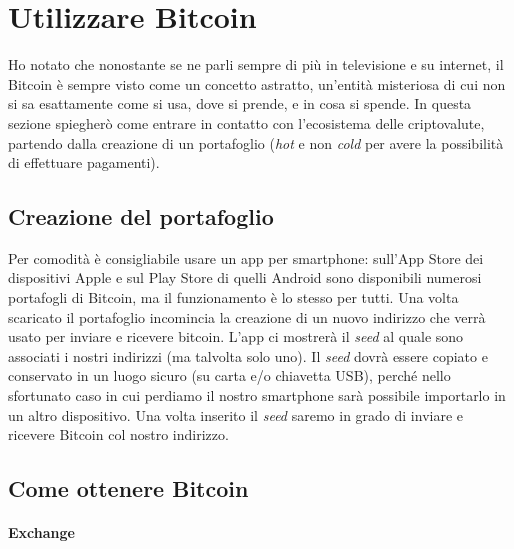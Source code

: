 \documentclass {article}
\begin{document}
\newpage


\section {Utilizzare Bitcoin}


Ho notato che nonostante se ne parli sempre di più in televisione e su internet, il Bitcoin è sempre visto come un concetto astratto, un'entità misteriosa di cui non si sa esattamente come si usa, dove si prende, e in cosa si spende.
In questa sezione spiegherò come entrare in contatto con l'ecosistema delle criptovalute, partendo dalla creazione di un portafoglio (\textit{hot} e non \textit{cold} per avere la possibilità di effettuare pagamenti).


\subsection {Creazione del portafoglio}


Per comodità è consigliabile usare un app per smartphone: sull'App Store dei dispositivi Apple e sul Play Store di quelli Android sono disponibili numerosi portafogli di Bitcoin, ma il funzionamento è lo stesso per tutti.
Una volta scaricato il portafoglio incomincia la creazione di un nuovo indirizzo che verrà usato per inviare e ricevere bitcoin.
L'app ci mostrerà il \textit{seed} al quale sono associati i nostri indirizzi (ma talvolta solo uno).
Il \textit{seed} dovrà essere copiato e conservato in un luogo sicuro (su carta e/o chiavetta USB), perché nello sfortunato caso in cui perdiamo il nostro smartphone sarà possibile importarlo in un altro dispositivo.
Una volta inserito il \textit{seed} saremo in grado di inviare e ricevere Bitcoin col nostro indirizzo.


\subsection {Come ottenere Bitcoin}


\paragraph {Exchange}
\end{document}
